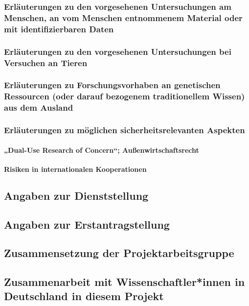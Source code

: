 \documentclass[de]{dfg-proposal}
\begin{document}
\subsubsection{Erläuterungen zu den vorgesehenen Untersuchungen am Menschen, an vom Menschen entnommenem Material oder mit identifizierbaren Daten}

\subsubsection{Erläuterungen zu den vorgesehenen Untersuchungen bei Versuchen an Tieren}

\subsubsection{Erläuterungen zu Forschungsvorhaben an genetischen Ressourcen (oder darauf bezogenem traditionellem Wissen) aus dem Ausland}

\subsubsection{Erläuterungen zu möglichen sicherheitsrelevanten Aspekten}

\paragraph{„Dual-Use Research of Concern“; Außenwirtschaftsrecht}

\paragraph{Risiken in internationalen Kooperationen}

\subsection{Angaben zur Dienststellung}

\subsection{Angaben zur Erstantragstellung}

\subsection{Zusammensetzung der Projektarbeitsgruppe}

\subsection{Zusammenarbeit mit Wissenschaftler*innen in Deutschland in diesem Projekt}
\end{document}
